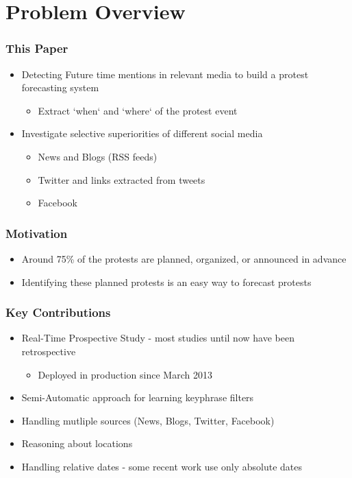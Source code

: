 \documentclass[red,handout]{beamer}
\begin{document}
\section{Problem Overview}
\begin{frame}
    \frametitle{This Paper}
    \begin{itemize}[<+->]
        \item
            Detecting Future time mentions in relevant media to build a protest forecasting system
            \begin{itemize}
                \item
                    Extract `when` and `where` of the protest event
            \end{itemize}
        \item
            Investigate selective superiorities of different social media
            \begin{itemize}[<+->]
                \item
                    News and Blogs (RSS feeds)
                \item
                    Twitter and links extracted from tweets
                \item
                    Facebook
            \end{itemize}
    \end{itemize}
\end{frame}

\begin{frame}
    \frametitle{Motivation}
    \begin{itemize}[<+->]
        \item
            Around 75\% of the protests are planned, organized, or announced in advance
        \item
            Identifying these planned protests is an easy way to forecast protests
    \end{itemize}
\end{frame}

\begin{frame}
    \frametitle{Key Contributions}
    \begin{itemize}[<+->]
        \item
            Real-Time Prospective Study - most studies until now have been retrospective
            \begin{itemize}
                \item
                    Deployed in production since March 2013
            \end{itemize}
        \item
            Semi-Automatic approach for learning keyphrase filters
        \item
            Handling mutliple sources (News, Blogs, Twitter, Facebook)
        \item
            Reasoning about locations
        \item
            Handling relative dates - some recent work use only absolute dates
    \end{itemize}
\end{frame}
\end{document}
